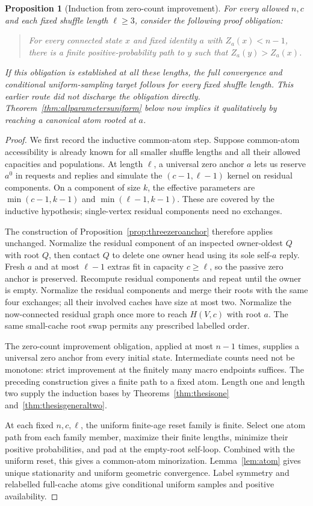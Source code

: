 \documentclass[11pt]{article}
\newtheorem{proposition}[theorem]{Proposition}
\begin{document}
\begin{proposition}[Induction from zero-count improvement]
\label{prop:zeroexpansioncriterion}
For every allowed $n,c$ and each fixed shuffle length
$\ell\ge3$, consider the following proof obligation:
\begin{quote}
For every connected state $x$ and fixed identity $a$
with $Z_a(x)<n-1$, there is a finite positive-probability
path to $y$ such that $Z_a(y)>Z_a(x)$.
\end{quote}
If this obligation is established at all these lengths,
the full convergence and conditional uniform-sampling
target follows for every fixed shuffle length.
This earlier route did not discharge the obligation directly.
Theorem~\ref{thm:allparametersuniform} below now implies it
qualitatively by reaching a canonical atom rooted at $a$.
\end{proposition}
\begin{proof}
We first record the inductive common-atom step.
Suppose common-atom accessibility is already known
for all smaller shuffle lengths and all their
allowed capacities and populations. At length
$\ell$, a universal zero anchor $a$ lets us reserve
$a^0$ in requests and replies and simulate the
$(c-1,\ell-1)$ kernel on residual components.
On a component of size $k$, the effective parameters
are $\min(c-1,k-1)$ and $\min(\ell-1,k-1)$.
These are covered by the inductive hypothesis;
single-vertex residual components need no exchanges.

The construction of Proposition~\ref{prop:threezeroanchor}
therefore applies unchanged. Normalize the residual
component of an inspected owner-oldest $Q$ with
root $Q$, then contact $Q$ to delete one owner head
using its sole self-$a$ reply. Fresh $a$ and at most
$\ell-1$ extras fit in capacity $c\ge\ell$, so the
passive zero anchor is preserved. Recompute residual
components and repeat until the owner is empty.
Normalize the residual components and merge their
roots with the same four exchanges; all their
involved caches have size at most two. Normalize
the now-connected residual graph once more to
reach $H(V,c)$ with root $a$. The same small-cache
root swap permits any prescribed labelled order.

The zero-count improvement obligation, applied at
most $n-1$ times, supplies a universal zero anchor
from every initial state. Intermediate counts need
not be monotone: strict improvement at the finitely
many macro endpoints suffices. The preceding
construction gives a finite path to a fixed atom.
Length one and length two supply the induction
bases by Theorems~\ref{thm:thesisone}
and~\ref{thm:thesisgeneraltwo}.

At each fixed $n,c,\ell$, the uniform finite-age
reset family is finite. Select one atom path from
each family member, maximize their finite lengths,
minimize their positive probabilities, and pad at
the empty-root self-loop. Combined with the uniform
reset, this gives a common-atom minorization.
Lemma~\ref{lem:atom} gives unique stationarity and
uniform geometric convergence. Label symmetry and
relabelled full-cache atoms give conditional
uniform samples and positive availability.
\end{proof}
\end{document}
